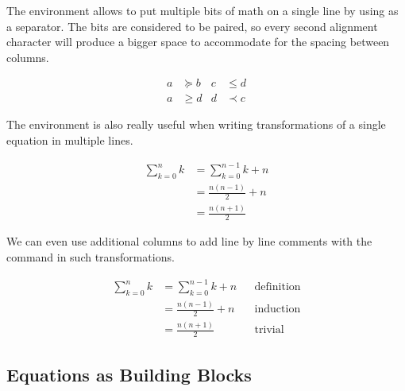 The environment allows to put multiple bits of math on a single line by
using \ai{\&} as a separator. The bits are considered to be paired, so every second
alignment character will produce a bigger space to accommodate for the spacing
between columns.
\begin{example}
\begin{align}
  a & \succeq b & c & \leq d \\
  a & \geq d & d & \prec c
\end{align}
\end{example}

The  environment is also really useful when writing transformations of
a single equation in multiple lines.
\begin{example}
\begin{align}
  \sum_{k=0}^n k 
    &= \sum_{k=0}^{n-1} k + n \\
    &= \frac{n(n-1)}{2} + n \\
    &= \frac{n(n+1)}{2}
\end{align}
\end{example}
We can even use additional columns to add line by
line comments with the  command in such transformations.
\begin{example}
\begin{align*}
  \sum_{k=0}^n k
    &= \sum_{k=0}^{n-1} k + n
      && \text{definition} \\
    &= \frac{n(n - 1)}{2} + n
      && \text{induction} \\
    &= \frac{n(n + 1)}{2}
      && \text{trivial}
\end{align*}
\end{example}

\subsection{Equations as Building Blocks}

